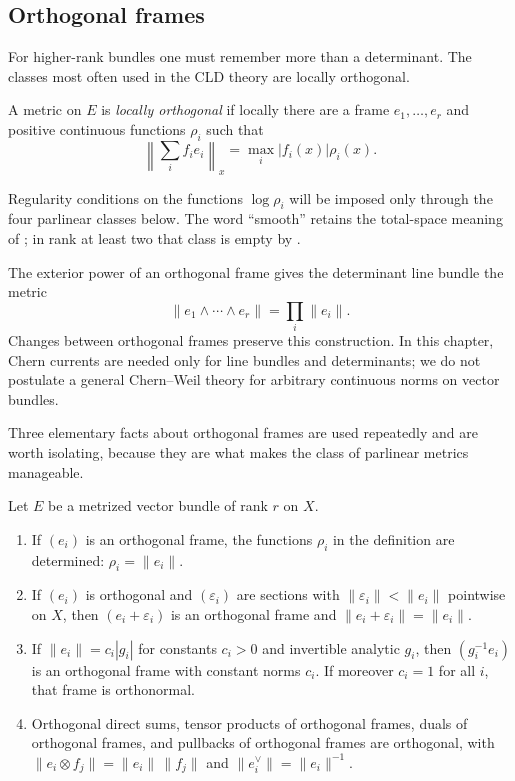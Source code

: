 \subsection{Orthogonal frames}
\label{sec:ch17-orthogonal}

For higher-rank bundles one must remember more than a determinant.  The
classes most often used in the CLD theory are locally orthogonal.

\begin{definition}
\label{def:ch17-locally-orthogonal-metric}
A metric on $E$ is \emph{locally orthogonal} if locally there are a frame
$e_1,\ldots,e_r$ and positive continuous functions $\rho_i$ such that
\[
 \left\|\sum_i f_i e_i\right\|_x
       =\max_i |f_i(x)|\rho_i(x).
\]
\end{definition}

Regularity conditions on the functions $\log\rho_i$ will be imposed only
through the four parlinear classes below.  The word ``smooth'' retains the
total-space meaning of ; in rank at least two
that class is empty by .

The exterior power of an orthogonal frame gives the determinant line bundle
the metric
\[
          \|e_1\wedge\cdots\wedge e_r\|
             =\prod_i\|e_i\|.
\]
Changes between orthogonal frames preserve this construction.  In this
chapter, Chern currents are needed only for line bundles and determinants;
we do not postulate a general Chern--Weil theory for arbitrary continuous
norms on vector bundles.

Three elementary facts about orthogonal frames are used repeatedly and are
worth isolating, because they are what makes the class of parlinear metrics
manageable.

\begin{lemma}
\label{lem:ch17-orthogonal-frames}
Let $E$ be a metrized vector bundle of rank $r$ on $X$.
\begin{enumerate}
\item\label{itm:ch17-of:unique}
 If $(e_i)$ is an orthogonal frame, the functions $\rho_i$ in the
 definition are determined: $\rho_i=\|e_i\|$.
\item\label{itm:ch17-of:perturb}
 If $(e_i)$ is orthogonal and $(\varepsilon_i)$ are sections with
 $\|\varepsilon_i\|<\|e_i\|$ pointwise on $X$, then
 $(e_i+\varepsilon_i)$ is an orthogonal frame and
 $\|e_i+\varepsilon_i\|=\|e_i\|$.
\item\label{itm:ch17-of:normalize}
 If $\|e_i\|=c_i|g_i|$ for constants $c_i>0$ and invertible analytic
 $g_i$, then $(g_i^{-1}e_i)$ is an orthogonal frame with constant norms
 $c_i$.  If moreover $c_i=1$ for all $i$, that frame is orthonormal.
\item\label{itm:ch17-of:ops}
 Orthogonal direct sums, tensor products of orthogonal frames, duals of
 orthogonal frames, and pullbacks of orthogonal frames are orthogonal, with
 $\|e_i\otimes f_j\|=\|e_i\|\,\|f_j\|$ and
 $\|e_i^\vee\|=\|e_i\|^{-1}$.
\end{enumerate}
\end{lemma}

